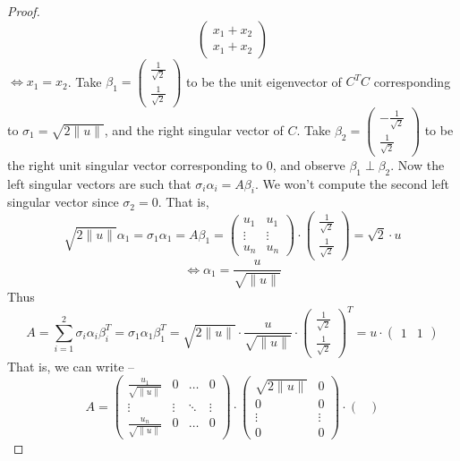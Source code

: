 \documentclass[11pt]{article}
\theoremstyle{quest}
\begin{document}
\begin{proof}
$$\begin{pmatrix}
x_1 + x_2\\
x_1 + x_2
\end{pmatrix}$$
$\iff x_1 = x_2$. Take $\beta_1 = \begin{pmatrix}
\frac{1}{\sqrt{2}} \\
\frac{1}{\sqrt{2}}
\end{pmatrix}$ to be the unit eigenvector of $C^TC$ corresponding to $\sigma_1 = \sqrt{2\|u\|}$, and the right singular vector of $C$. Take $\beta_2 = \begin{pmatrix}
-\frac{1}{\sqrt{2}} \\
\frac{1}{\sqrt{2}}
\end{pmatrix}$ to be the right unit singular vector corresponding to $0$, and observe $\beta_1 \perp \beta_2$.
Now the left singular vectors are such that $\sigma_i \alpha_i = A \beta_i$. We won't compute the second left singular vector since $\sigma_2 = 0$. That is,
$$\sqrt{2\|u\|} \alpha_1 = \sigma_1 \alpha_1 = A \beta_1 = \begin{pmatrix}
u_1 & u_1 \\
\vdots & \vdots \\
u_n & u_n
\end{pmatrix} \cdot \begin{pmatrix}
\frac{1}{\sqrt{2}} \\
\frac{1}{\sqrt{2}}
\end{pmatrix} = \sqrt{2} \cdot u$$
$$\iff \alpha_1 = \dfrac{u}{\sqrt{\|u\|}}$$
Thus
$$A = \sum_{i=1}^2 \sigma_i \alpha_i \beta_i^T = \sigma_1 \alpha_1 \beta_1^T = \sqrt{2\|u\|} \cdot \dfrac{u}{\sqrt{\|u\|}} \cdot \begin{pmatrix}
\frac{1}{\sqrt{2}} \\
\frac{1}{\sqrt{2}}
\end{pmatrix}^T = u \cdot \begin{pmatrix}
1 & 1
\end{pmatrix} $$
That is, we can write --
$$A = \begin{pmatrix}
\frac{u_1}{\sqrt{\|u\|}} & 0 & \ldots & 0 \\
\vdots & \vdots & \ddots & \vdots \\
\frac{u_n}{\sqrt{\|u\|}} & 0 & \ldots & 0
\end{pmatrix} \cdot \begin{pmatrix}
\sqrt{2\|u\|} & 0 \\
0 & 0 \\
\vdots & \vdots \\
0 & 0
\end{pmatrix} \cdot \begin{pmatrix}

\end{pmatrix}$$
\end{proof}
\end{document}
